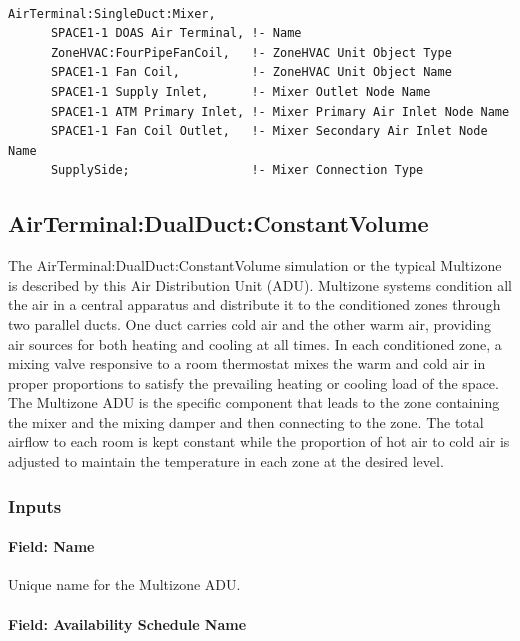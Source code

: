 \begin{lstlisting}

AirTerminal:SingleDuct:Mixer,
      SPACE1-1 DOAS Air Terminal, !- Name
      ZoneHVAC:FourPipeFanCoil,   !- ZoneHVAC Unit Object Type
      SPACE1-1 Fan Coil,          !- ZoneHVAC Unit Object Name
      SPACE1-1 Supply Inlet,      !- Mixer Outlet Node Name
      SPACE1-1 ATM Primary Inlet, !- Mixer Primary Air Inlet Node Name
      SPACE1-1 Fan Coil Outlet,   !- Mixer Secondary Air Inlet Node Name
      SupplySide;                 !- Mixer Connection Type
\end{lstlisting}

\subsection{AirTerminal:DualDuct:ConstantVolume}\label{airterminaldualductconstantvolume}

The AirTerminal:DualDuct:ConstantVolume simulation or the typical Multizone is described by this Air Distribution Unit (ADU). Multizone systems condition all the air in a central apparatus and distribute it to the conditioned zones through two parallel ducts. One duct carries cold air and the other warm air, providing air sources for both heating and cooling at all times. In each conditioned zone, a mixing valve responsive to a room thermostat mixes the warm and cold air in proper proportions to satisfy the prevailing heating or cooling load of the space. The Multizone ADU is the specific component that leads to the zone containing the mixer and the mixing damper and then connecting to the zone. The total airflow to each room is kept constant while the proportion of hot air to cold air is adjusted to maintain the temperature in each zone at the desired level.

\subsubsection{Inputs}\label{inputs-14-000}

\paragraph{Field: Name}\label{field-name-14}

Unique name for the Multizone ADU.

\paragraph{Field: Availability Schedule Name}\label{field-availability-schedule-name-11}

